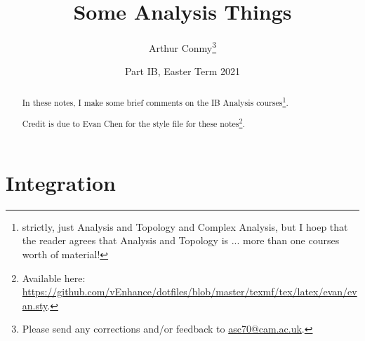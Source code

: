 \documentclass[11pt]{scrartcl}
\begin{document}
\title{Some Analysis Things}
\author{Arthur Conmy\footnote{Please send any corrections and/or feedback to \url{asc70@cam.ac.uk}.}}
\date{Part IB, Easter Term 2021}

\maketitle
\begin{abstract}
In these notes, I make some brief comments on the IB Analysis courses\footnote{strictly, just Analysis and Topology and Complex Analysis, but I hoep that the reader agrees that Analysis and Topology is ... more than one courses worth of material!}.

Credit is due to Evan Chen for the style file for these notes\footnote{Available here: \url{https://github.com/vEnhance/dotfiles/blob/master/texmf/tex/latex/evan/evan.sty}.}.
\end{abstract}

\section{Integration}
\end{document}
